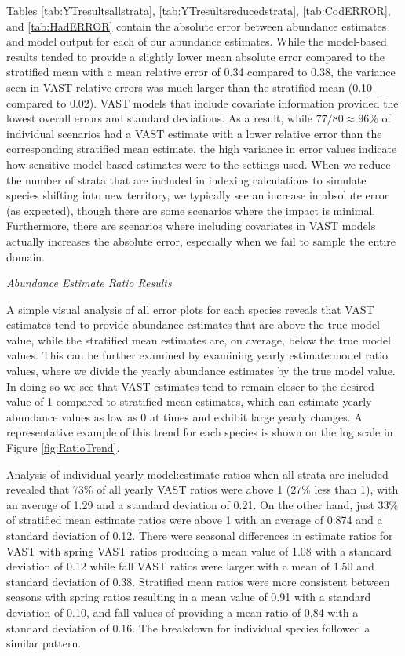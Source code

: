 \documentclass[
  12pt,
]{article}
\begin{document}
Tables \ref{tab:YTresultsallstrata}, \ref{tab:YTresultsreducedstrata}, \ref{tab:CodERROR}, and \ref{tab:HadERROR} contain the absolute error between abundance estimates and model output for each of our abundance estimates. While the model-based results tended to provide a slightly lower mean absolute error compared to the stratified mean with a mean relative error of 0.34 compared to 0.38, the variance seen in VAST relative errors was much larger than the stratified mean (0.10 compared to 0.02). VAST models that include covariate information provided the lowest overall errors and standard deviations. As a result, while \(77/80\approx 96\%\) of individual scenarios had a VAST estimate with a lower relative error than the corresponding stratified mean estimate, the high variance in error values indicate how sensitive model-based estimates were to the settings used. When we reduce the number of strata that are included in indexing calculations to simulate species shifting into new territory, we typically see an increase in absolute error (as expected), though there are some scenarios where the impact is minimal. Furthermore, there are scenarios where including covariates in VAST models actually increases the absolute error, especially when we fail to sample the entire domain.

\emph{Abundance Estimate Ratio Results}

A simple visual analysis of all error plots for each species reveals that VAST estimates tend to provide abundance estimates that are above the true model value, while the stratified mean estimates are, on average, below the true model values. This can be further examined by examining yearly estimate:model ratio values, where we divide the yearly abundance estimates by the true model value. In doing so we see that VAST estimates tend to remain closer to the desired value of 1 compared to stratified mean estimates, which can estimate yearly abundance values as low as 0 at times and exhibit large yearly changes. A representative example of this trend for each species is shown on the log scale in Figure \ref{fig:RatioTrend}.

Analysis of individual yearly model:estimate ratios when all strata are included revealed that 73\% of all yearly VAST ratios were above 1 (27\% less than 1), with an average of 1.29 and a standard deviation of 0.21. On the other hand, just 33\% of stratified mean estimate ratios were above 1 with an average of 0.874 and a standard deviation of 0.12. There were seasonal differences in estimate ratios for VAST with spring VAST ratios producing a mean value of 1.08 with a standard deviation of 0.12 while fall VAST ratios were larger with a mean of 1.50 and standard deviation of 0.38. Stratified mean ratios were more consistent between seasons with spring ratios resulting in a mean value of 0.91 with a standard deviation of 0.10, and fall values of providing a mean ratio of 0.84 with a standard deviation of 0.16. The breakdown for individual species followed a similar pattern.
\end{document}
